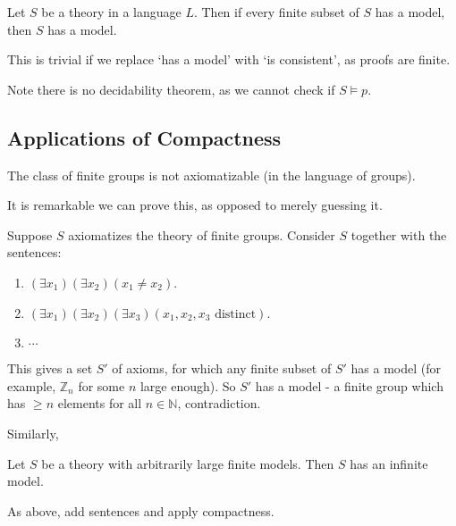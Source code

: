 \documentclass[12pt]{article}
\begin{document}
\begin{theorem}
	Let $S$ be a theory in a language $L$. Then if every finite subset of $S$ has a model, then $S$ has a model.
\end{theorem}

\begin{proofbox}
	This is trivial if we replace `has a model' with `is consistent', as proofs are finite.
\end{proofbox}

Note there is no decidability theorem, as we cannot check if $S \models p$.

\subsection{Applications of Compactness}
\label{sub:applications_of_compactness}

\begin{corollary}
	The class of finite groups is not axiomatizable (in the language of groups).
\end{corollary}

It is remarkable we can prove this, as opposed to merely guessing it.

\begin{proofbox}
	Suppose $S$ axiomatizes the theory of finite groups. Consider $S$ together with the sentences:
	\begin{enumerate}
		\item $(\exists x_1)(\exists x_2)(x_1 \neq x_2)$.
		\item $(\exists x_1)(\exists x_2)(\exists x_3)(x_1, x_2, x_3 \text{ distinct})$.
		\item $\cdots$
	\end{enumerate}
	This gives a set $S'$ of axioms, for which any finite subset of $S'$ has a model (for example, $\mathbb{Z}_n$ for some $n$ large enough). So $S'$ has a model - a finite group which has $\geq n$ elements for all $n \in \mathbb{N}$, contradiction.
\end{proofbox}

Similarly,

\begin{corollary}
	Let $S$ be a theory with arbitrarily large finite models. Then $S$ has an infinite model.
\end{corollary}

\begin{proofbox}
	As above, add sentences and apply compactness.
\end{proofbox}
\end{document}
